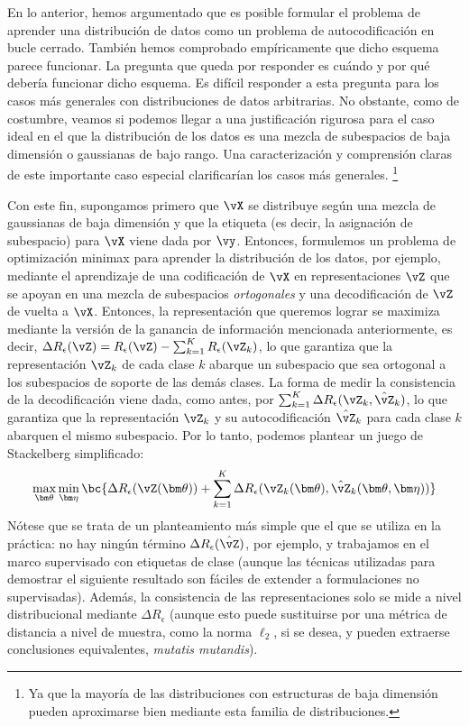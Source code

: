 \documentclass[../../book-main_es.tex]{subfiles}
\begin{document}
En lo anterior, hemos argumentado que es posible formular el
problema de aprender una distribución de datos como un problema de autocodificación
en bucle cerrado. También hemos comprobado empíricamente que dicho esquema parece funcionar.
La pregunta que queda por responder es cuándo y por qué debería funcionar dicho esquema. Es
difícil responder a esta pregunta para los casos más generales con
distribuciones de datos arbitrarias. No obstante, como de costumbre, veamos si
podemos llegar a una justificación rigurosa para el caso ideal en el que la
distribución de los datos es una mezcla de subespacios de baja dimensión o
gaussianas de bajo rango. Una caracterización y comprensión claras de
este importante caso especial clarificarían los casos más generales.
\footnote{Ya que la mayoría de las distribuciones con estructuras de baja dimensión
pueden aproximarse bien mediante esta familia de distribuciones.}

Con este fin, supongamos primero que \(\vX\) se distribuye
según una mezcla de gaussianas de baja dimensión y que la etiqueta
(es decir, la asignación de subespacio) para \(\vX\) viene dada por \(\vy\). Entonces,
formulemos un problema de optimización minimax para aprender la distribución de los datos,
por ejemplo, mediante el aprendizaje de una codificación de \(\vX\) en
representaciones \(\vZ\) que se apoyan en una mezcla de
subespacios \textit{ortogonales} y una decodificación de \(\vZ\) de vuelta a
\(\vX\). Entonces, la representación que queremos lograr se maximiza mediante
la versión de la ganancia de información mencionada anteriormente, es decir, \( 
    \Delta R_{\epsilon}(\vZ) = R_{\epsilon}(\vZ) - \sum_{k=1}^K
R_{\epsilon}(\vZ_{k}) \), lo que garantiza que la representación
\(\vZ_{k}\) de cada clase \(k\) abarque un subespacio que sea ortogonal
a los subespacios de soporte de las demás clases. La forma de medir la
consistencia de la decodificación viene dada, como antes, por \(\sum_{k =
1}^{K}\Delta R_\epsilon(\vZ_{k}, \hat{\vZ}_{k})\), lo que garantiza
que la representación \(\vZ_{k}\) y su autocodificación
\(\hat{\vZ}_{k}\) para cada clase \(k\) abarquen el mismo subespacio. Por lo tanto,
podemos plantear un juego de Stackelberg simplificado:
\begin{equation}\label{eq:ctrl_msp_game}
    \max_{\bm \theta}\min_{\bm \eta}\bc{\Delta R_\epsilon(\vZ(\bm
        \theta)) + \sum_{k = 1}^{K}\Delta R_\epsilon(\vZ_{k}(\bm \theta),
    \hat{\vZ}_{k}(\bm \theta, \bm \eta))}
\end{equation}
Nótese que se trata de un planteamiento más simple que el que se utiliza en
la práctica: no hay ningún término \(\Delta R_\epsilon(\hat{\vZ})\), por
ejemplo, y trabajamos en el marco supervisado con etiquetas de clase
(aunque las técnicas utilizadas para demostrar el siguiente resultado son fáciles
de extender a formulaciones no supervisadas). Además, la consistencia de las
representaciones solo se mide a nivel distribucional mediante
\(\Delta R_\epsilon\) (aunque esto puede sustituirse por una
    métrica de distancia a nivel de muestra, como la norma \(\ell_{2}\), si se desea,
y pueden extraerse conclusiones equivalentes, \textit{mutatis mutandis}).
\end{document}
